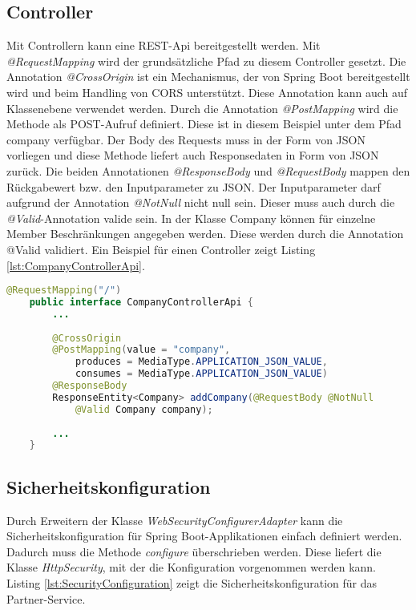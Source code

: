 \subsection{Controller}
Mit Controllern kann eine REST-Api bereitgestellt werden. Mit \textit{@RequestMapping} wird der grundsätzliche Pfad zu diesem Controller gesetzt. Die Annotation \textit{@CrossOrigin} ist ein Mechanismus, der von Spring Boot bereitgestellt wird und beim Handling von CORS unterstützt. Diese Annotation kann auch auf Klassenebene verwendet werden.
Durch die Annotation \textit{@PostMapping} wird die Methode als POST-Aufruf definiert. Diese ist in diesem Beispiel unter dem Pfad \glqq company\grqq{} verfügbar. Der Body des Requests muss in der Form von JSON vorliegen und diese Methode liefert auch Responsedaten in Form von JSON zurück. Die beiden Annotationen \textit{@ResponseBody} und \textit{@RequestBody} mappen den Rückgabewert bzw. den Inputparameter zu JSON. 
Der Inputparameter darf aufgrund der Annotation \textit{@NotNull} nicht null sein. Dieser muss auch durch die \textit{@Valid}-Annotation valide sein. In der Klasse Company können für einzelne Member Beschränkungen angegeben werden. Diese werden durch die Annotation @Valid validiert. Ein Beispiel für einen Controller zeigt Listing \ref{lst:CompanyControllerApi}.

\begin{lstlisting}[language=java, caption=CompanyControllerApi.java, label=lst:CompanyControllerApi]
	@RequestMapping("/")
	public interface CompanyControllerApi {
		...
	
		@CrossOrigin
		@PostMapping(value = "company",
			produces = MediaType.APPLICATION_JSON_VALUE,
			consumes = MediaType.APPLICATION_JSON_VALUE)
		@ResponseBody
		ResponseEntity<Company> addCompany(@RequestBody @NotNull 
			@Valid Company company);
		
		...
	}
\end{lstlisting}

\subsection{Sicherheitskonfiguration}
Durch Erweitern der Klasse \textit{WebSecurityConfigurerAdapter} kann die Sicherheitskonfiguration für Spring Boot-Applikationen einfach definiert werden.
Dadurch muss die Methode \textit{configure} überschrieben werden. Diese liefert die Klasse \textit{HttpSecurity}, mit der die Konfiguration vorgenommen werden kann. Listing \ref{lst:SecurityConfiguration} zeigt die Sicherheitskonfiguration für das Partner-Service.  

